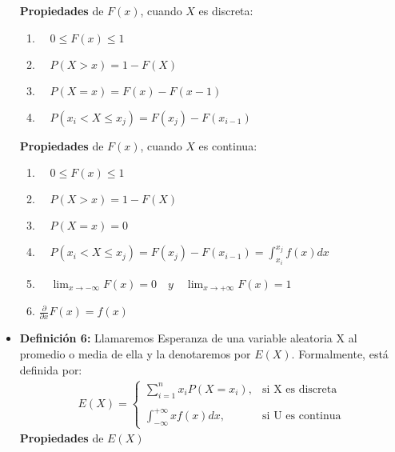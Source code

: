 \documentclass{templateNote}
\begin{document}
\begin{itemize}
    \textbf{Propiedades} de $F(x)$, cuando $X$ es discreta:
    \begin{enumerate}
        \item $\quad 0 \leq F(x) \leq 1$
        
        \item $\quad P(X>x) = 1 - F(X)$
        
        \item $\quad P(X=x) = F(x) - F(x-1)$
        
        \item $\quad P(x_i < X \leq x_j) = F(x_j) - F(x_{i-1})$
    \end{enumerate}  

    \newpage
    \textbf{Propiedades} de $F(x)$, cuando $X$ es continua:
    \begin{enumerate}
        \item $\quad 0 \leq F(x) \leq 1$
        
        \item $\quad P(X>x) = 1 - F(X)$
        
        \item $\quad P(X=x) = 0$
        
        \item $\quad P(x_i < X \leq x_j) = F(x_j) - F(x_{i-1}) = \int_{x_i}^{x_j}{f(x)dx}$
        
        \item $\quad \lim_{x \rightarrow-\infty}{F(x)} = 0 \quad y \quad \lim_{x \rightarrow+\infty}{F(x)} = 1$
    
        \item $ \frac{\partial}{\partial x}F(x) = f(x)$
    \end{enumerate} 

    \item \textbf{Definición 6:} Llamaremos Esperanza de una variable aleatoria X al promedio o media de ella y
    la denotaremos por $E(X)$. Formalmente, está definida por:
    \begin{align*}
        E(X) = \begin{cases}
            \displaystyle\sum_{i=1}^{n}{x_iP(X=x_i)}, 
            & \text{si X es discreta} \\
            \\
            \displaystyle\int_{-\infty}^{+\infty}{xf(x)dx},
            & \text{si U es continua}
        \end{cases}
    \end{align*}
    \textbf{Propiedades} de $E(X)$


\end{itemize}
\end{document}
